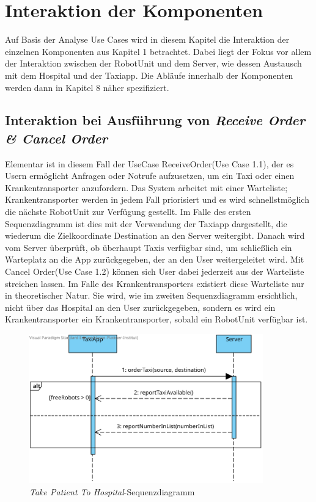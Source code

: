 \section{Interaktion der Komponenten}
Auf Basis der Analyse Use Cases wird in diesem Kapitel die Interaktion der einzelnen Komponenten aus Kapitel 1 betrachtet. Dabei liegt der Fokus vor allem der Interaktion zwischen der RobotUnit und dem Server, wie dessen Austausch mit dem Hospital und der Taxiapp. Die Abläufe innerhalb der Komponenten werden dann in Kapitel 8 näher spezifiziert. \\


\subsection*{Interaktion bei Ausführung von \emph{Receive Order \& Cancel Order}}

Elementar ist in diesem Fall der UseCase ReceiveOrder(Use Case 1.1), der es Usern ermöglicht Anfragen oder Notrufe aufzusetzen, um ein Taxi oder einen Krankentransporter anzufordern. Das System arbeitet mit einer Warteliste; Krankentransporter werden in jedem Fall priorisiert und es wird schnellstmöglich die nächste RobotUnit zur Verfügung gestellt. Im Falle des ersten Sequenzdiagramm ist dies mit der Verwendung der Taxiapp dargestellt, die wiederum die Zielkoordinate Destination an den Server weitergibt. Danach wird vom Server überprüft, ob überhaupt Taxis verfügbar sind, um schließlich ein Warteplatz an die App zurückgegeben, der an den User weitergeleitet wird. Mit Cancel Order(Use Case 1.2) können sich User dabei jederzeit aus der Warteliste streichen lassen. Im Falle des Krankentransporters existiert diese Warteliste nur in theoretischer Natur. Sie wird, wie im zweiten Sequenzdiagramm ersichtlich, nicht über das Hospital an den User zurückgegeben, sondern es wird ein Krankentransporter ein Krankentransporter, sobald ein RobotUnit verfügbar ist. \\

\begin{figure}[H]
	\centering
	\includegraphics[width=0.9\textwidth]{img/2-Entwurf-RecieveOrder-Taxi.svg}
	\caption{\emph{Take Patient To Hospital}-Sequenzdiagramm}
	\label{SequenzDiagrammInteraktion}
\end{figure}

